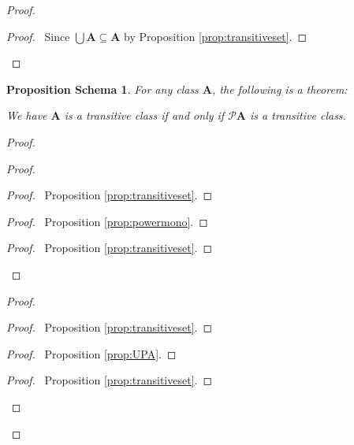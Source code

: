 \documentclass{book}
\let\qed\relax
\newtheorem{props}[ax]{Proposition Schema}
\theoremstyle{definition}
\begin{document}
\begin{proof}
\pf
{}
\begin{proof}
	\pf\ Since $\bigcup \mathbf{A} \subseteq \mathbf{A}$ by Proposition \ref{prop:transitiveset}.
\end{proof}
\qed
\end{proof}

\begin{props}
\label{prop:powtransitive}
For any class $\mathbf{A}$, the following is a theorem:

We have $\mathbf{A}$ is a transitive class if and only if $\mathcal{P} \mathbf{A}$ is a transitive class.
\end{props}

\begin{proof}
\pf
{}
\begin{proof}
	\begin{proof}
		\pf\ Proposition \ref{prop:transitiveset}.
	\end{proof}
	\begin{proof}
		\pf\ Proposition \ref{prop:powermono}.
	\end{proof}
	\begin{proof}
		\pf\ Proposition \ref{prop:transitiveset}.
	\end{proof}
\end{proof}
\begin{proof}
	\begin{proof}
		\pf\ Proposition \ref{prop:transitiveset}.
	\end{proof}
	\begin{proof}
		\pf\ Proposition \ref{prop:UPA}.
	\end{proof}
	\begin{proof}
		\pf\ Proposition \ref{prop:transitiveset}.
	\end{proof}
\end{proof}
\qed
\end{proof}
\end{document}
